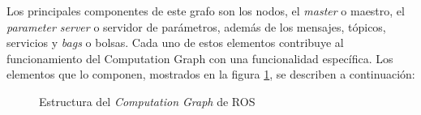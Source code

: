 Los principales componentes de este grafo son los nodos, el \textit{master} o maestro, el \textit{parameter server} o servidor de parámetros, además de los mensajes, tópicos, servicios y \textit{bags} o bolsas. Cada uno de estos elementos contribuye al funcionamiento del Computation Graph con una funcionalidad específica. Los elementos que lo componen, mostrados en la figura \ref{fig:computationGraph}, se describen a continuación:

\newpage

\begin{figure}[ht]
    \centering
    \def\svgwidth{350pt}
    
    \caption{Estructura del \textit{Computation Graph} de ROS}
    \label{fig:computationGraph}
\end{figure}


